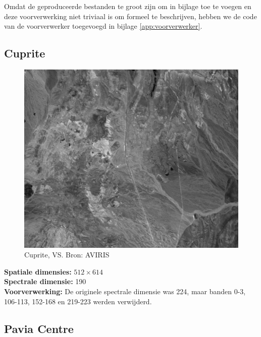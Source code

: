 Omdat de geproduceerde bestanden te groot zijn om in bijlage toe te voegen en deze voorverwerking niet triviaal is om formeel te beschrijven, hebben we de code van de voorverwerker toegevoegd in bijlage \ref{app:voorverwerker}.

\subsection{Cuprite}

\begin{figure}[H]
  \centering
  \includegraphics[scale=0.5]{images/cuprite_sum.png}
  \caption{Cuprite, VS. Bron: AVIRIS \cite{ref:cuprite}}
  \label{fig:cuprite_sum}
\end{figure}

\textbf{Spatiale dimensies:} $512 \times 614$\\
\textbf{Spectrale dimensie:} 190\\
\textbf{Voorverwerking:} De originele spectrale dimensie was 224, maar banden 0-3, 106-113, 152-168 en 219-223 werden verwijderd.

\subsection{Pavia Centre}

